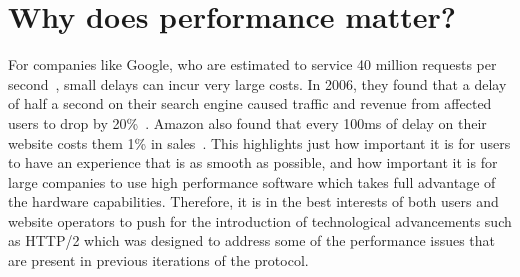 \section{Why does performance matter?}

For companies like Google, who are estimated to service 40 million requests per second~\cite{googlerequests}, small delays can incur very large costs. In 2006, they found that a delay of half a second on their search engine caused traffic and revenue from affected users to drop by 20\%~\cite{googlestats}. Amazon also found that every 100ms of delay on their website costs them 1\% in sales~\cite{amazonstats}. This highlights just how important it is for users to have an experience that is as smooth as possible, and how important it is for large companies to use high performance software which takes full advantage of the hardware capabilities. Therefore, it is in the best interests of both users and website operators to push for the introduction of technological advancements such as HTTP/2 which was designed to address some of the performance issues that are present in previous iterations of the protocol.

